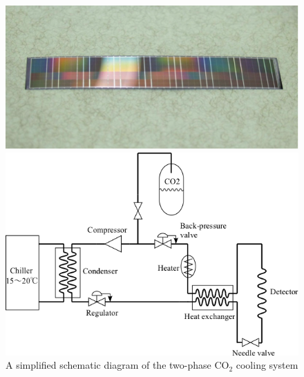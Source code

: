 \begin{figure}[hb]
 \begin{minipage}[t]{0.49\textwidth}
\centering     \includegraphics*[width=\textwidth,keepaspectratio]{VertexDetector/FPCCD/realSizeFPCCDSensor.png}
    \caption{Real size FPCCD sensor thinned down to \SI{50}{\micro\meter}}
    \label{fig:FPCCD:realSizeSensor}
 \end{minipage}
 \hfill
 \begin{minipage}[t]{0.49\textwidth}
 \centering
    \includegraphics*[width=\textwidth,keepaspectratio]{VertexDetector/FPCCD/coolingSystemSchematic.png}
    \caption{A simplified schematic diagram of the two-phase $\text{CO}_2$ cooling system}
    \label{fig:FPCCD:coolingSystemSchematic}
 \end{minipage}
 \end{figure}

